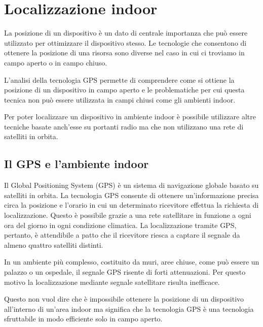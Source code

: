 
\chapter{Localizzazione indoor}
\label{cap:localizzazione-indoor}

La posizione di un dispositivo è un dato di centrale importanza che può essere utilizzato per ottimizzare il dispositivo stesso. Le tecnologie che consentono di ottenere la posizione di una risorsa sono diverse nel caso in cui ci troviamo in campo aperto o in campo chiuso.

L’analisi della tecnologia GPS permette di comprendere come si ottiene la posizione di un dispositivo in campo aperto e le problematiche per cui questa tecnica non può essere utilizzata in campi chiusi come gli ambienti indoor.

Per poter localizzare un dispositivo in ambiente indoor è possibile utilizzare altre tecniche basate anch'esse su portanti radio ma che non utilizzano una rete di satelliti in orbita.

\section{Il GPS e l'ambiente indoor}
Il Global Positioning System (GPS) \cite{wiki:gps} è un sistema di navigazione globale basato su satelliti in orbita. La tecnologia GPS consente di ottenere un'informazione precisa circa la posizione e l'orario in cui un determinato ricevitore effettua la richiesta di localizzazione. Questo è possibile grazie a una rete satellitare in funzione a ogni ora del giorno in ogni condizione climatica. La localizzazione tramite GPS, pertanto, è attendibile a patto che il ricevitore riesca a captare il segnale da almeno quattro satelliti distinti.

In un ambiente più complesso, costituito da muri, aree chiuse, come può essere un palazzo o un ospedale, il segnale GPS risente di forti attenuazioni. Per questo motivo la localizzazione mediante segnale satellitare risulta inefficace.

Questo non vuol dire che è impossibile ottenere la posizione di un dispositivo all'interno di un'area indoor ma significa che la tecnologia GPS è una tecnologia sfruttabile in modo efficiente solo in campo aperto.

